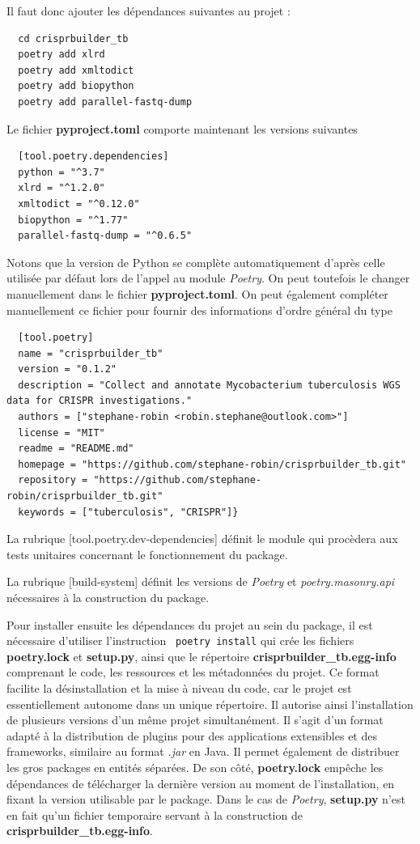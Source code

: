 \documentclass[twoside,a4paper,11pt,frenchb,openany]{report}
\begin{document}
Il faut donc ajouter les dépendances suivantes au projet :
\begin{verbatim}  cd crisprbuilder_tb 
  poetry add xlrd 
  poetry add xmltodict 
  poetry add biopython
  poetry add parallel-fastq-dump \end{verbatim}

Le fichier \textbf{pyproject.toml} comporte maintenant les versions suivantes

\begin{verbatim}  [tool.poetry.dependencies]
  python = "^3.7"
  xlrd = "^1.2.0"
  xmltodict = "^0.12.0"
  biopython = "^1.77"
  parallel-fastq-dump = "^0.6.5"\end{verbatim}

Notons que la version de Python se complète automatiquement d'après celle utilisée par défaut lors de l'appel au module \textit{Poetry}. On peut toutefois le changer manuellement dans le fichier \textbf{pyproject.toml}. On peut également compléter manuellement ce fichier pour fournir des informations d'ordre général du type

\begin{verbatim}  [tool.poetry]
  name = "crisprbuilder_tb"
  version = "0.1.2"
  description = "Collect and annotate Mycobacterium tuberculosis WGS data for CRISPR investigations."
  authors = ["stephane-robin <robin.stephane@outlook.com>"]
  license = "MIT"
  readme = "README.md"
  homepage = "https://github.com/stephane-robin/crisprbuilder_tb.git"
  repository = "https://github.com/stephane-robin/crisprbuilder_tb.git"
  keywords = ["tuberculosis", "CRISPR"]}\end{verbatim}

La rubrique [tool.poetry.dev-dependencies] définit le module qui procèdera aux tests unitaires concernant le fonctionnement du package.

La rubrique [build-system] définit les versions de \textit{Poetry} et \textit{poetry.masonry.api} nécessaires à la construction du package.

Pour installer ensuite les dépendances du projet au sein du package, il est nécessaire d’utiliser l’instruction
\texttt{ poetry install}
qui crée les fichiers \textbf{poetry.lock} et \textbf{setup.py}, ainsi que le répertoire \textbf{crisprbuilder\_tb.egg-info} comprenant le code, les ressources et les métadonnées du projet. Ce format facilite la désinstallation et la mise à niveau du code, car le projet est essentiellement autonome dans un unique répertoire. Il autorise ainsi l'installation de plusieurs versions d'un même projet simultanément. Il s'agit d'un format adapté à la distribution de plugins pour des applications extensibles et des frameworks, similaire au format \textit{.jar} en Java. Il permet également de distribuer les gros packages en entités séparées. De son côté, \textbf{poetry.lock} empêche les dépendances de télécharger la dernière version au moment de l’installation, en fixant la version utilisable par le package. Dans le cas de \textit{Poetry}, \textbf{setup.py} n'est en fait qu'un fichier temporaire servant à la construction de \textbf{crisprbuilder\_tb.egg-info}. 
\end{document}
